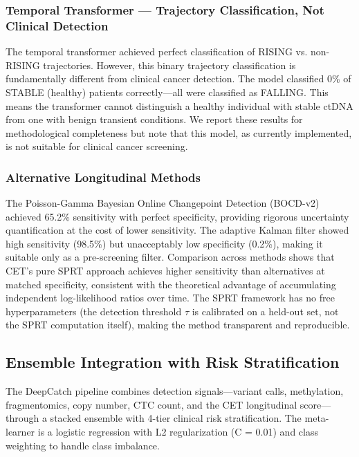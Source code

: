 \documentclass[10pt,a4paper]{article}
\begin{document}
\subsubsection{Temporal Transformer — Trajectory Classification, Not Clinical Detection}

The temporal transformer achieved perfect classification of RISING vs. non-RISING trajectories. However, this binary trajectory classification is fundamentally different from clinical cancer detection. The model classified 0\% of STABLE (healthy) patients correctly—all were classified as FALLING. This means the transformer cannot distinguish a healthy individual with stable ctDNA from one with benign transient conditions. We report these results for methodological completeness but note that this model, as currently implemented, is not suitable for clinical cancer screening.

\subsubsection{Alternative Longitudinal Methods}

The Poisson-Gamma Bayesian Online Changepoint Detection (BOCD-v2) achieved 65.2\% sensitivity with perfect specificity, providing rigorous uncertainty quantification at the cost of lower sensitivity. The adaptive Kalman filter showed high sensitivity (98.5\%) but unacceptably low specificity (0.2\%), making it suitable only as a pre-screening filter. Comparison across methods shows that CET's pure SPRT approach achieves higher sensitivity than alternatives at matched specificity, consistent with the theoretical advantage of accumulating independent log-likelihood ratios over time. The SPRT framework has no free hyperparameters (the detection threshold $\tau$ is calibrated on a held-out set, not the SPRT computation itself), making the method transparent and reproducible.

\subsection{Ensemble Integration with Risk Stratification}
\label{sec:ensemble}

The DeepCatch pipeline combines detection signals—variant calls, methylation, fragmentomics, copy number, CTC count, and the CET longitudinal score—through a stacked ensemble with 4-tier clinical risk stratification. The meta-learner is a logistic regression with L2 regularization (C = 0.01) and class weighting to handle class imbalance.
\end{document}
